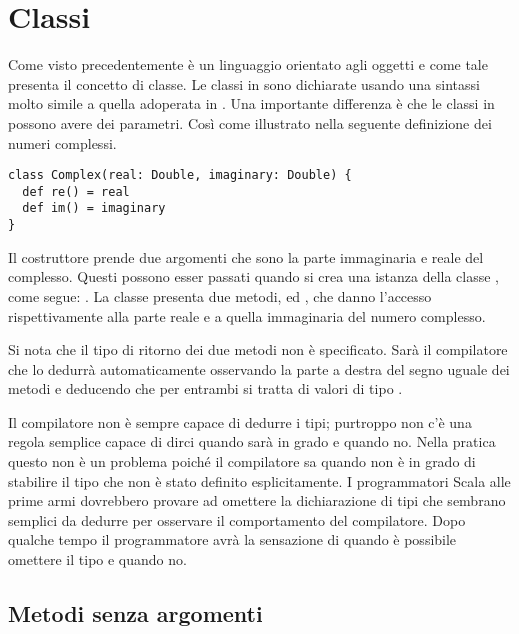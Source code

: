 \section{Classi}
\label{sec:classes}

Come visto precedentemente \Scala \`e un linguaggio orientato agli oggetti e come tale presenta il concetto di classe. 
Le classi in \Scala sono dichiarate usando una sintassi molto simile a quella adoperata in \Java. Una importante differenza \`e che le classi in \Scala possono avere dei parametri. Cos\`i come illustrato nella seguente definizione dei numeri complessi.
\begin{lstlisting}
class Complex(real: Double, imaginary: Double) {
  def re() = real
  def im() = imaginary
}
\end{lstlisting}
Il costruttore prende due argomenti che sono la parte immaginaria e reale del complesso. Questi possono esser passati quando si crea una istanza della classe , come segue: . La classe presenta due metodi,  ed , che danno l'accesso rispettivamente alla parte reale e a quella immaginaria del numero complesso.

Si nota che il tipo di ritorno dei due metodi non \`e specificato. Sar\`a  il compilatore che lo dedurr\`a  automaticamente osservando la parte a destra del segno uguale dei metodi e deducendo che per entrambi si tratta di valori di tipo .

Il compilatore non \`e sempre capace di dedurre i tipi; purtroppo non c'\`e una regola semplice capace di dirci quando sar\`a   in grado e quando no. Nella pratica questo non \`e un problema poich\'e il compilatore sa quando non \`e in grado di stabilire il tipo che non \`e stato definito esplicitamente. I programmatori Scala alle prime armi dovrebbero provare ad omettere la dichiarazione di tipi che sembrano semplici da dedurre per osservare il comportamento del compilatore. Dopo qualche tempo il programmatore avr\`a la sensazione di quando \`e possibile omettere il tipo e quando no.

\subsection{Metodi senza argomenti}
\label{sec:meth-wo-args}

